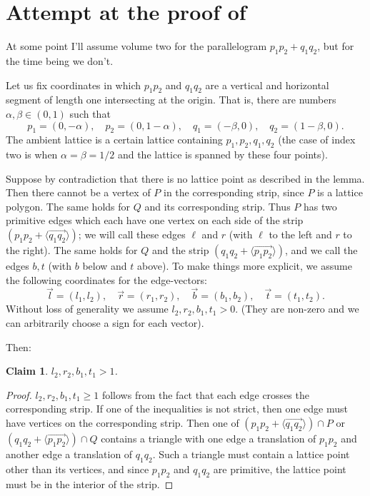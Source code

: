 \documentclass{amsart}
\theoremstyle{plain}
\newtheorem{claim}[theorem]{Claim}
\theoremstyle{definition}
\begin{document}
\appendix
\section{Attempt at the proof of }

At some point I'll assume volume two for the parallelogram $p_1p_2 + q_1q_2$, but for the time being we don't.

Let us fix coordinates in which $p_1p_2$ and $q_1q_2$ are a vertical and horizontal segment of length one intersecting at the origin. That is, there are numbers $\alpha, \beta \in (0,1)$ such that
\[
p_1=(0,-\alpha), \quad
p_2=(0,1-\alpha), \quad
q_1=(-\beta,0), \quad
q_2=(1-\beta,0).
\] 
The ambient lattice is a certain lattice containing $p_1,p_2,q_1,q_2$ (the case of index two is when $\alpha=\beta=1/2$ and the lattice is spanned by these four points).

Suppose by contradiction that there is no lattice point as described in the lemma. Then there cannot be a vertex of $P$ in the corresponding strip, since $P$ is a lattice polygon. The same holds for $Q$ and its corresponding strip. Thus $P$ has two primitive edges which each have one vertex on each side of the strip $(p_1p_2 + \langle \overrightarrow{q_1q_2}\rangle)$; we will call these edges $\ell$ and $r$ (with $\ell$ to the left and $r$ to the right). The same holds for $Q$ and the strip $(q_1q_2 + \langle \overrightarrow{p_1p_2}\rangle)$, and we call the edges  $b, t$ (with $b$ below and $t$ above). To make things more explicit, we assume the following coordinates for the edge-vectors:
\[
\vec l = (l_1,l_2), \quad
\vec r= (r_1,r_2), \quad
\vec b= (b_1,b_2), \quad
\vec t= (t_1,t_2).
\]
Without loss of generality we assume $l_2,r_2,b_1,t_1 >0$. (They are non-zero and we can arbitrarily choose a sign for each vector).

Then:

\begin{claim}
$l_2, r_2, b_1, t_1 >1$.
\end{claim}

\begin{proof}
$l_2, r_2, b_1, t_1 \ge 1$ follows from the fact that each edge crosses the corresponding strip. 
If one of the inequalities is not strict, then one edge must have vertices on the corresponding strip. Then one of $(p_1p_2 + \langle \overrightarrow{q_1q_2}\rangle) \cap P$ or $(q_1q_2 + \langle \overrightarrow{p_1p_2}\rangle) \cap Q$
contains a triangle with one edge a translation of $p_1p_2$ and another edge a translation of $q_1q_2$. Such a triangle must contain a lattice point other than its vertices, and since $p_1p_2$ and $q_1q_2$ are primitive, the lattice point must be in the interior of the strip.
\end{proof}
\end{document}
